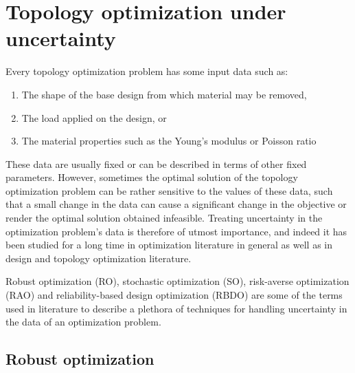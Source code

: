 \newpage
\section{Topology optimization under uncertainty}

Every topology optimization problem has some input data such as:
\begin{enumerate}
\item The shape of the base design from which material may be removed, 
\item The load applied on the design, or
\item The material properties such as the Young's modulus or Poisson ratio
\end{enumerate}
These data are usually fixed or can be described in terms of other fixed parameters. However, sometimes the optimal solution of the topology optimization problem can be rather sensitive to the values of these data, such that a small change in the data can cause a significant change in the objective or render the optimal solution obtained infeasible. Treating uncertainty in the optimization problem's data is therefore of utmost importance, and indeed it has been studied for a long time in optimization literature in general as well as in design and topology optimization literature.

Robust optimization (RO), stochastic optimization (SO), risk-averse optimization (RAO) and reliability-based design optimization (RBDO) are some of the terms used in literature to describe a plethora of techniques for handling uncertainty in the data of an optimization problem. 

\subsection{Robust optimization}

